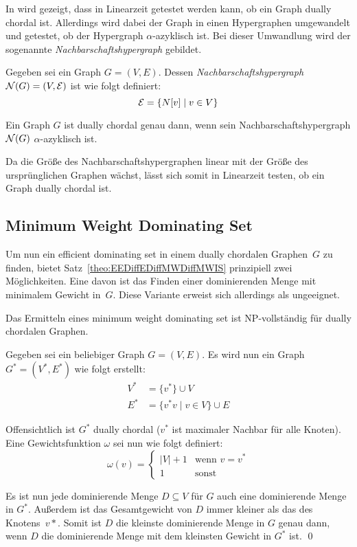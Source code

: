 In \cite{duallyChordal} wird gezeigt, dass in Linearzeit getestet werden kann, ob ein Graph dually chordal ist. Allerdings wird dabei der Graph in einen Hypergraphen umgewandelt und getestet, ob der Hypergraph $\alpha$-azyklisch ist. Bei dieser Umwandlung wird der sogenannte \emph{Nachbarschaftshypergraph} gebildet. 

\begin{mydef}
    Gegeben sei ein Graph $G=(V,E)$. Dessen \emph{Nachbarschaftshypergraph} $\mathcal{N}(G)=(V,\mathcal{E})$ ist wie folgt definiert:
    \[ \mathcal{E} = \{N[v] \mid v \in V\} \]
\end{mydef}

\begin{Theorem}
    \cite{duallyChordal} Ein Graph $G$ ist dually chordal genau dann, wenn sein Nachbarschaftshypergraph $\mathcal{N}(G)$ $\alpha$-azyklisch ist.
\end{Theorem}

Da die Größe des Nachbarschaftshypergraphen linear mit der Größe des ursprünglichen Graphen wächst, lässt sich somit in Linearzeit testen, ob ein Graph dually chordal ist.

\subsection{Minimum Weight Dominating Set}
Um nun ein efficient dominating set in einem dually chordalen Graphen~$G$ zu finden, bietet Satz~\ref{theo:EEDiffEDiffMWDiffMWIS} prinzipiell zwei Möglichkeiten. Eine davon ist das Finden einer dominierenden Menge mit minimalem Gewicht in~$G$. Diese Variante erweist sich allerdings als ungeeignet.

\begin{Theorem}
    Das Ermitteln eines minimum weight dominating set ist NP-vollständig für dually chordalen Graphen.
\end{Theorem}

\begin{Proof}
    Gegeben sei ein beliebiger Graph $G=(V,E)$. Es wird nun ein Graph $G^*=(V^*,E^*)$ wie folgt erstellt:
    \begin{align*}
        V^* &= \{ v^* \} \cup V \\
        E^* &= \{v^*v \mid v \in V \} \cup E
    \end{align*}
    
    Offensichtlich ist $G^*$ dually chordal ($v^*$ ist maximaler Nachbar für alle Knoten). Eine Gewichtsfunktion $\omega$ sei nun wie folgt definiert:
    \[ \omega(v)=
            \begin{cases}
                |V| + 1 & \text{wenn } v = v^* \\ 
                1 & \text{sonst} 
            \end{cases}
    \]
    
    Es ist nun jede dominierende Menge $D \subseteq V$ für $G$ auch eine dominierende Menge in $G^*$. Außerdem ist das Gesamtgewicht von $D$ immer kleiner als das des Knotens~$v*$. Somit ist $D$ die kleinste dominierende Menge in $G$ genau dann, wenn $D$ die dominierende Menge mit dem kleinsten Gewicht in $G^*$ ist.
    \qed
\end{Proof}

